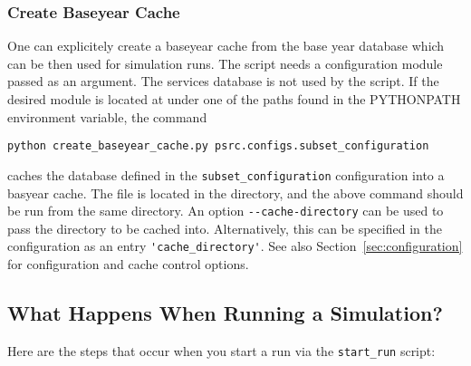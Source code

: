 \subsubsection{Create Baseyear Cache}
\label{sec:run-manager-baseyearcache}
%
One can explicitely create a baseyear
cache \baseyearcacheindex{} from
the base year database which can be then used for simulation runs. The script
needs a configuration module passed as an argument. The services database is
not used by the script. If the desired module is located at
 under one of the paths found in the
PYTHONPATH \pythonpathindex environment variable, \environmentvariablesindex the command
\pythonindex
\begin{verbatim}
python create_baseyear_cache.py psrc.configs.subset_configuration
\end{verbatim}
caches the database defined in the \verb|subset_configuration| configuration into a basyear
cache. \baseyearcacheindex The  file is located in
the  directory, and the above command should be
run from the same directory. An option \verb|--cache-directory|
can be used to pass the directory to be cached into. Alternatively, this can be
specified in the configuration as an entry \verb|'cache_directory'|. See also
Section~\ref{sec:configuration} for configuration and cache control options.

\subsection{What Happens When Running a Simulation?}
\label{sec:run-manager-tasks}
Here are the steps that occur when you start a run via the \verb|start_run|
script:

